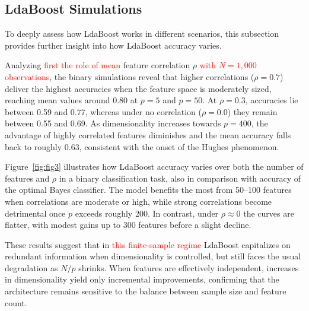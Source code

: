 \documentclass[11pt,a4paper]{article}
\providecommand{\DIFaddtex}[1]{\textcolor{red}{#1}} %
\providecommand{\DIFaddbegin}{} %
\providecommand{\DIFaddend}{} %
\providecommand{\DIFadd}[1]{\texorpdfstring{\DIFaddtex{#1}}{#1}} %
\begin{document}
\DIFaddend \subsection*{LdaBoost Simulations}
To deeply assess how LdaBoost works in different scenarios, this subsection provides further insight into how LdaBoost accuracy varies.

Analyzing  \DIFaddbegin \DIFadd{first the role of mean }\DIFaddend feature correlation $\rho$ \DIFaddbegin \DIFadd{with $N=1{,}000$ observations}\DIFaddend , the binary simulations reveal that higher correlations ($\rho = 0.7$) deliver the highest accuracies when the feature space is moderately sized, reaching mean values around 0.80 at $p = 5$ and $p = 50$. At $\rho = 0.3$, accuracies lie between 0.59 and 0.77, whereas under no correlation ($\rho = 0.0$) they remain between 0.55 and 0.69. As dimensionality increases towards $p = 400$, the advantage of highly correlated features diminishes and the mean accuracy falls back to roughly 0.63, consistent with the onset of the Hughes phenomenon.

Figure~\ref{fig:fig3} illustrates how LdaBoost accuracy varies over both the number of features and $\rho$ in a binary classification task, also in comparison with accuracy of the optimal Bayes classifier. The model benefits the most from 50--100 features when correlations are moderate or high, while strong correlations become detrimental once $p$ exceeds roughly 200. In contrast, under $\rho \approx 0$ the curves are flatter, with modest gains up to 300 features before a slight decline.

These results suggest that in  \DIFaddbegin \DIFadd{this finite-sample regime }\DIFaddend LdaBoost capitalizes on redundant information when dimensionality is controlled, but still faces the usual degradation as $N/p$ shrinks. When features are effectively independent, increases in dimensionality yield only incremental improvements, confirming that the architecture remains sensitive to the balance between sample size and feature count.
\end{document}
